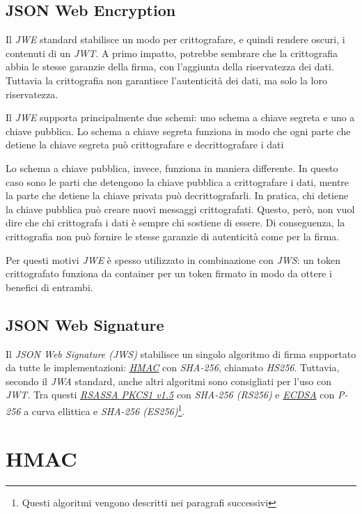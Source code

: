 \subsection{JSON Web Encryption}
Il \emph{\gls{JWE}} standard stabilisce un modo per crittografare, e quindi rendere oscuri, i contenuti di un \emph{JWT}.
A primo impatto, potrebbe sembrare che la crittografia abbia le stesse garanzie della firma, con l'aggiunta della riservatezza dei dati.
Tuttavia la crittografia non garantisce l'autenticità dei dati, ma solo la loro riservatezza.

Il \emph{JWE} supporta principalmente due schemi: uno schema a chiave segreta e uno a chiave pubblica.
Lo schema a chiave segreta funziona in modo che ogni parte che detiene la chiave segreta può crittografare e decrittografare i dati

Lo schema a chiave pubblica, invece, funziona in maniera differente.
In questo caso sono le parti che detengono la chiave pubblica a crittografare i dati, mentre la parte che detiene la chiave privata può decrittografarli.
In pratica, chi detiene la chiave pubblica può creare nuovi messaggi crittografati.
Questo, però, non vuol dire che chi crittografa i dati è sempre chi sostiene di essere. Di conseguenza, la crittografia non può fornire le stesse garanzie di autenticità come per la firma.

Per questi motivi \emph{JWE} è spesso utilizzato in combinazione con \emph{\gls{JWS}}: un token crittografato funziona da container per un token firmato in modo da ottere i benefici di entrambi.

\subsection{JSON Web Signature}
Il \emph{JSON Web Signature (JWS)} stabilisce un singolo algoritmo di firma supportato da tutte le implementazioni: \emph{\hyperref[sec:hmac]{HMAC}} con \emph{\gls{SHA-256}}, chiamato \emph{HS256}.
Tuttavia, secondo il \emph{\gls{JWA}} standard, anche altri algoritmi sono consigliati per l'uso con \emph{JWT}.
Tra questi \emph{\hyperref[sec:rsassa]{RSASSA PKCS1 v1.5}} con \emph{SHA-256 (RS256)} e \emph{\hyperref[sec:ecdsa]{ECDSA}} con \emph{\gls{P-256}} a curva ellittica e \emph{SHA-256 (ES256)}\footnote{Questi algoritmi vengono descritti nei paragrafi successivi}.


\section{HMAC}
\label{sec:hmac}

